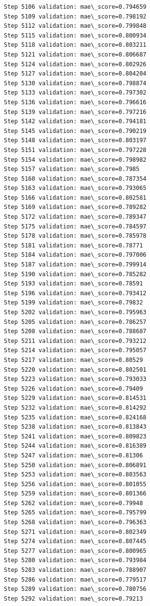 \documentclass[11pt]{article}
\begin{document}
\begin{Verbatim}[commandchars=\\\{\}]
Step 5106 validation: mae\_score=0.794659
Step 5109 validation: mae\_score=0.798192
Step 5112 validation: mae\_score=0.799848
Step 5115 validation: mae\_score=0.800934
Step 5118 validation: mae\_score=0.803211
Step 5121 validation: mae\_score=0.806687
Step 5124 validation: mae\_score=0.802926
Step 5127 validation: mae\_score=0.804204
Step 5130 validation: mae\_score=0.798874
Step 5133 validation: mae\_score=0.797302
Step 5136 validation: mae\_score=0.796616
Step 5139 validation: mae\_score=0.797216
Step 5142 validation: mae\_score=0.794181
Step 5145 validation: mae\_score=0.790219
Step 5148 validation: mae\_score=0.803197
Step 5151 validation: mae\_score=0.797228
Step 5154 validation: mae\_score=0.798982
Step 5157 validation: mae\_score=0.7985
Step 5160 validation: mae\_score=0.787354
Step 5163 validation: mae\_score=0.793065
Step 5166 validation: mae\_score=0.802581
Step 5169 validation: mae\_score=0.789282
Step 5172 validation: mae\_score=0.789347
Step 5175 validation: mae\_score=0.784597
Step 5178 validation: mae\_score=0.785978
Step 5181 validation: mae\_score=0.78771
Step 5184 validation: mae\_score=0.797006
Step 5187 validation: mae\_score=0.799914
Step 5190 validation: mae\_score=0.785282
Step 5193 validation: mae\_score=0.78591
Step 5196 validation: mae\_score=0.793412
Step 5199 validation: mae\_score=0.79832
Step 5202 validation: mae\_score=0.795963
Step 5205 validation: mae\_score=0.786257
Step 5208 validation: mae\_score=0.788687
Step 5211 validation: mae\_score=0.793212
Step 5214 validation: mae\_score=0.795057
Step 5217 validation: mae\_score=0.80529
Step 5220 validation: mae\_score=0.802501
Step 5223 validation: mae\_score=0.793033
Step 5226 validation: mae\_score=0.79409
Step 5229 validation: mae\_score=0.814531
Step 5232 validation: mae\_score=0.814292
Step 5235 validation: mae\_score=0.824168
Step 5238 validation: mae\_score=0.813843
Step 5241 validation: mae\_score=0.809823
Step 5244 validation: mae\_score=0.816389
Step 5247 validation: mae\_score=0.81306
Step 5250 validation: mae\_score=0.806891
Step 5253 validation: mae\_score=0.803563
Step 5256 validation: mae\_score=0.801055
Step 5259 validation: mae\_score=0.801366
Step 5262 validation: mae\_score=0.79948
Step 5265 validation: mae\_score=0.795799
Step 5268 validation: mae\_score=0.796363
Step 5271 validation: mae\_score=0.802349
Step 5274 validation: mae\_score=0.807445
Step 5277 validation: mae\_score=0.800965
Step 5280 validation: mae\_score=0.793984
Step 5283 validation: mae\_score=0.788907
Step 5286 validation: mae\_score=0.779517
Step 5289 validation: mae\_score=0.780756
Step 5292 validation: mae\_score=0.79213

\end{Verbatim}
\end{document}
